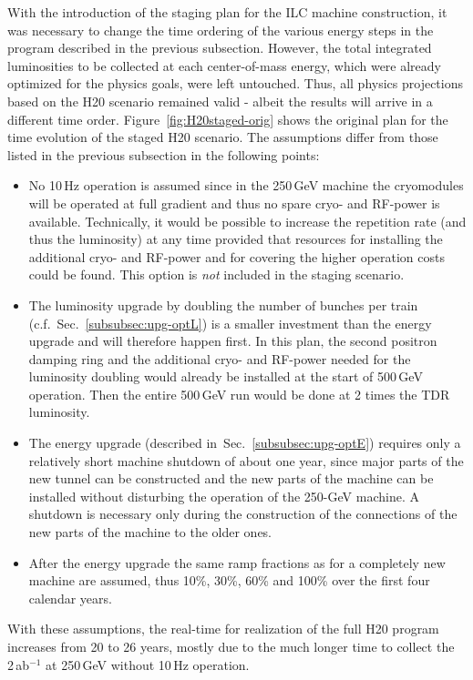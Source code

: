 With the introduction of the staging plan for the ILC machine construction, it was necessary to change the time ordering of the 
various energy steps in the program described in the previous subsection. However, the total integrated luminosities to be collected at each center-of-mass energy, which were already optimized for the physics goals,  were left untouched. Thus,  all physics projections based on the H20 scenario remained valid - albeit the results will arrive in a different time order. Figure~\ref{fig:H20staged-orig} shows the original plan for the time evolution of the staged H20 scenario. The assumptions differ from those listed in the previous subsection in the following points:
\begin{itemize} 
\item No 10\,Hz operation is assumed since in the 250\,GeV machine the cryomodules will be operated at full gradient and thus no spare cryo- and RF-power is available. Technically, it would be possible to increase the repetition rate (and thus the luminosity) at any time provided that resources for installing the additional cryo- and RF-power and for covering the higher operation costs could be found. This option is {\em not} included in the staging scenario.
\item The luminosity upgrade by doubling the number of bunches per train (c.f.\ Sec.~\ref{subsubsec:upg-optL}) is a smaller investment than the energy upgrade and will therefore happen first. In this plan, the second positron damping ring and the additional cryo- and RF-power needed for the luminosity doubling would  already be installed at the start of 500\,GeV operation.  Then the entire 500\,GeV run would be done at 2 times the TDR luminosity. 
\item The energy upgrade (described in\ Sec.~\ref{subsubsec:upg-optE}) requires only a relatively short machine shutdown of about one year, since major parts of the new tunnel can be constructed and the new parts of the machine can be installed without disturbing the operation of the 250-GeV machine. A shutdown is necessary only during the construction of the connections of the new parts of the  machine to the older ones.
\item After the energy upgrade the same ramp fractions as for a completely new machine are assumed, thus 10\%, 30\%, 60\% and 100\% over the first four calendar years.
\end{itemize}
With these assumptions, the real-time for realization of  the full H20 program increases from 20 to 26 years, 
mostly due to the much longer time to collect the 2\,ab$^{-1}$ at 250\,GeV without 10\,Hz operation. 


